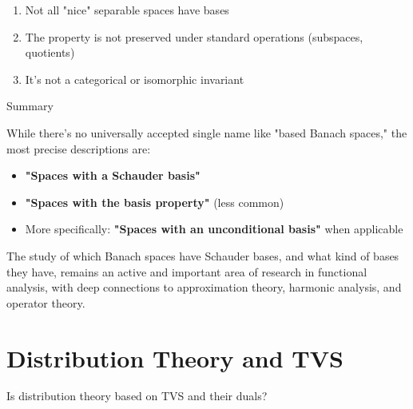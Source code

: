 \documentclass[aps,preprint]{revtex4}
\newenvironment{question}
  {\begin{tcolorbox}[colback=blue!5!white,colframe=blue!75!black,title=Question]}
  {\end{tcolorbox}}
\newenvironment{answer}
  {\begin{tcolorbox}[colback=green!5!white,colframe=green!75!black,title=Answer]}
  {\end{tcolorbox}}
\begin{document}
\begin{answer}
\begin{enumerate}
\item Not all "nice" separable spaces have bases

\item The property is not preserved under standard operations (subspaces,
quotients)

\item It's not a categorical or isomorphic invariant
\end{enumerate}

Summary

While there's no universally accepted single name like "based Banach
spaces," the most precise descriptions are:

\begin{itemize}
\item \textbf{"Spaces with a Schauder basis"}

\item \textbf{"Spaces with the basis property"} (less common)

\item More specifically: \textbf{"Spaces with an unconditional basis"} when
applicable
\end{itemize}

The study of which Banach spaces have Schauder bases, and what kind of bases
they have, remains an active and important area of research in functional
analysis, with deep connections to approximation theory, harmonic analysis,
and operator theory.
\end{answer}

\section{Distribution Theory and TVS}

\begin{question}
Is distribution theory based on TVS and their duals?
\end{question}
\end{document}

